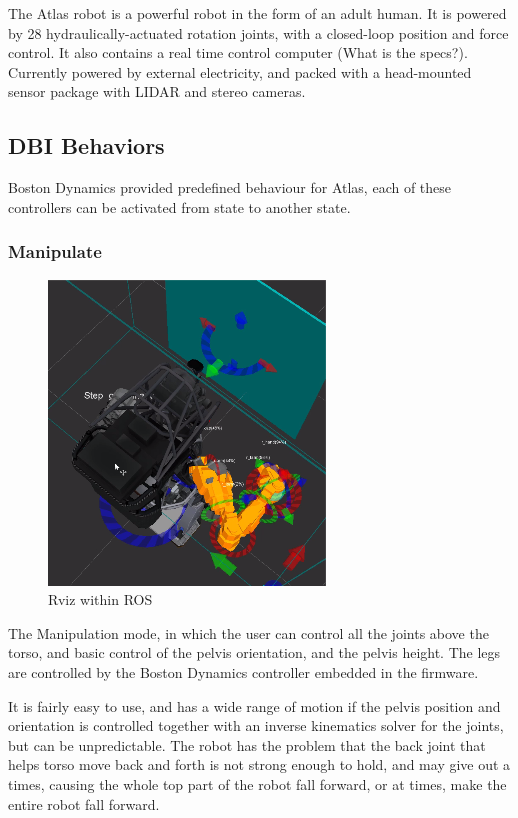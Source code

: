 \documentclass{article}
\begin{document}
The Atlas robot is a powerful robot in the form of an adult human. It is powered by 28 hydraulically-actuated rotation joints, with a closed-loop position and force control. It also contains a real time control computer (What is the specs?). Currently powered by external electricity, and packed with a head-mounted sensor package with LIDAR and stereo cameras. 

\subsection{DBI Behaviors}
Boston Dynamics provided predefined behaviour for Atlas, each of these controllers can be activated from state to another state. 

\subsubsection{Manipulate}
\begin{figure}
  \begin{center}
    \includegraphics[scale=0.5]{images/align_to_wall.png}
  \end{center}
  \caption{Rviz within ROS}
\end{figure}
The Manipulation mode, in which the user can control all the joints above the torso, and basic control of the pelvis orientation, and the pelvis height. The legs are controlled by the Boston Dynamics controller embedded in the firmware.

It is fairly easy to use, and has a wide range of motion if the pelvis position and orientation is controlled together with an inverse kinematics solver for the joints, but can be unpredictable. The robot has the problem that the back joint that helps torso move back and forth is not strong enough to hold, and may give out a times, causing the whole top part of the robot fall forward, or at times, make the entire robot fall forward. 
\end{document}

